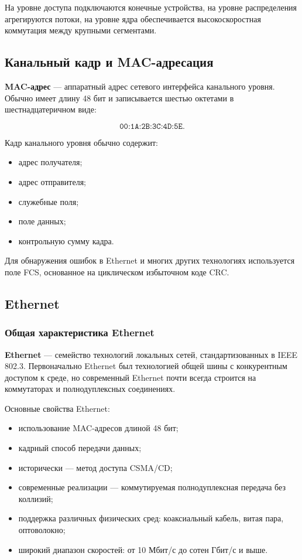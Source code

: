 \documentclass[12pt,a4paper]{article}
\begin{document}
На уровне доступа подключаются конечные устройства, на уровне распределения агрегируются потоки, на уровне ядра обеспечивается высокоскоростная коммутация между крупными сегментами.

\subsection{Канальный кадр и MAC-адресация}

\textbf{MAC-адрес} --- аппаратный адрес сетевого интерфейса канального уровня. Обычно имеет длину 48 бит и записывается шестью октетами в шестнадцатеричном виде:

\[
\texttt{00:1A:2B:3C:4D:5E}.
\]

Кадр канального уровня обычно содержит:
\begin{itemize}
    \item адрес получателя;
    \item адрес отправителя;
    \item служебные поля;
    \item поле данных;
    \item контрольную сумму кадра.
\end{itemize}

Для обнаружения ошибок в Ethernet и многих других технологиях используется поле FCS, основанное на циклическом избыточном коде CRC.

\subsection{Ethernet}

\subsubsection{Общая характеристика Ethernet}

\textbf{Ethernet} --- семейство технологий локальных сетей, стандартизованных в IEEE 802.3. Первоначально Ethernet был технологией общей шины с конкурентным доступом к среде, но современный Ethernet почти всегда строится на коммутаторах и полнодуплексных соединениях.

Основные свойства Ethernet:
\begin{itemize}
    \item использование MAC-адресов длиной 48 бит;
    \item кадрный способ передачи данных;
    \item исторически --- метод доступа CSMA/CD;
    \item современные реализации --- коммутируемая полнодуплексная передача без коллизий;
    \item поддержка различных физических сред: коаксиальный кабель, витая пара, оптоволокно;
    \item широкий диапазон скоростей: от 10 Мбит/с до сотен Гбит/с и выше.
\end{itemize}
\end{document}
